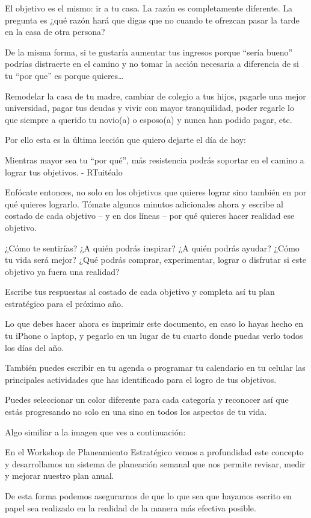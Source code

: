 \documentclass[12pt]{book}
\begin{document}
El objetivo es el mismo: ir a tu casa. La razón es completamente diferente. La pregunta es ¿qué razón hará que digas que no cuando te ofrezcan pasar la tarde en la casa de otra persona?

De la misma forma, si te gustaría aumentar tus ingresos porque “sería bueno” podrías distraerte en el camino y no tomar la acción necesaria a diferencia de si tu “por que” es porque quieres…

Remodelar la casa de tu madre, cambiar de colegio a tus hijos, pagarle una mejor universidad, pagar tus deudas y vivir con mayor tranquilidad, poder regarle lo que siempre a querido tu novio(a) o esposo(a) y nunca han podido pagar, etc.

Por ello esta es la última lección que quiero dejarte el día de hoy:

Mientras mayor sea tu “por qué”, más resistencia podrás soportar en el camino a lograr tus objetivos. - RTuitéalo

Enfócate entonces, no solo en los objetivos que quieres lograr sino también en por qué quieres lograrlo. Tómate algunos minutos adicionales ahora y escribe al costado de cada objetivo – y en dos líneas – por qué quieres hacer realidad ese objetivo.

¿Cómo te sentirías? ¿A quién podrás inspirar? ¿A quién podrás ayudar? ¿Cómo tu vida será mejor? ¿Qué podrás comprar, experimentar, lograr o disfrutar si este objetivo ya fuera una realidad?

Escribe tus respuestas al costado de cada objetivo y completa así tu plan estratégico para el próximo año.

Lo que debes hacer ahora es imprimir este documento, en caso lo hayas hecho en tu iPhone o laptop, y pegarlo en un lugar de tu cuarto donde puedas verlo todos los días del año.

También puedes escribir en tu agenda o programar tu calendario en tu celular las principales actividades que has identificado para el logro de tus objetivos.

Puedes seleccionar un color diferente para cada categoría y reconocer así que estás progresando no solo en una sino en todos los aspectos de tu vida.

Algo similiar a la imagen que ves a continuación:


En el Workshop de Planeamiento Estratégico vemos a profundidad este concepto y desarrollamos un sistema de planeación semanal que nos permite revisar, medir y mejorar nuestro plan anual.

De esta forma podemos asegurarnos de que lo que sea que hayamos escrito en papel sea realizado en la realidad de la manera más efectiva posible.
\end{document}

